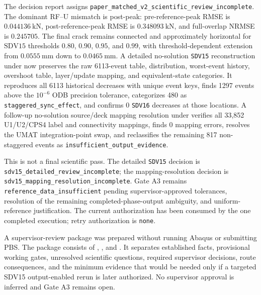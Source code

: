 \documentclass[11pt,a4paper]{article}
\begin{document}
The decision report assigns \texttt{paper\_matched\_v2\_scientific\_review\_incomplete}. The dominant RF--U mismatch is post-peak: pre-reference-peak RMSE is \(0.044136\ \mathrm{kN}\), post-reference-peak RMSE is \(0.348093\ \mathrm{kN}\), and full-overlap NRMSE is \(0.245705\). The final crack remains connected and approximately horizontal for \(\mathrm{SDV15}\) thresholds \(0.80\), \(0.90\), \(0.95\), and \(0.99\), with threshold-dependent extension from \(0.0555\ \mathrm{mm}\) down to \(0.0465\ \mathrm{mm}\). A detailed no-solution \texttt{SDV15} reconstruction under  now preserves the raw 6113-event table, distribution, worst-event history, overshoot table, layer/update mapping, and equivalent-state categories. It reproduces all 6113 historical decreases with unique event keys, finds 1297 events above the \(10^{-6}\) ODB precision tolerance, categorizes 480 as \texttt{staggered\_sync\_effect}, and confirms 0 \texttt{SDV16} decreases at those locations. A follow-up no-solution source/deck mapping resolution under  verifies all 33,852 U1/U2/CPS4 label and connectivity mappings, finds 0 mapping errors, resolves the UMAT integration-point swap, and reclassifies the remaining 817 non-staggered events as \texttt{insufficient\_output\_evidence}.

This is not a final scientific pass. The detailed \texttt{SDV15} decision is \texttt{sdv15\_detailed\_review\_incomplete}; the mapping-resolution decision is \texttt{sdv15\_mapping\_resolution\_incomplete}. Gate A3 remains \texttt{reference\_data\_insufficient} pending supervisor-approved tolerances, resolution of the remaining completed-phase-output ambiguity, and uniform-reference justification. The current authorization has been consumed by the one completed execution; retry authorization is \texttt{none}.

A supervisor-review package was prepared without running Abaqus or submitting PBS. The package consists of , , and . It separates established facts, provisional working gates, unresolved scientific questions, required supervisor decisions, route consequences, and the minimum evidence that would be needed only if a targeted SDV15 output-enabled rerun is later authorized. No supervisor approval is inferred and Gate A3 remains open.
\end{document}
